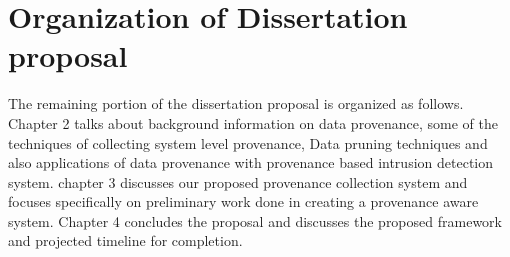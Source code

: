 \section{Organization of Dissertation proposal}

The remaining portion of the dissertation proposal is organized as follows.  Chapter 2 talks about background information on data provenance, some of the techniques of collecting system level provenance, Data pruning techniques and also applications of data provenance with provenance based intrusion detection system. chapter 3 discusses our proposed provenance collection system  and focuses specifically on preliminary work done in creating a provenance aware system. Chapter 4 concludes the proposal and discusses the proposed framework and projected timeline for completion.

